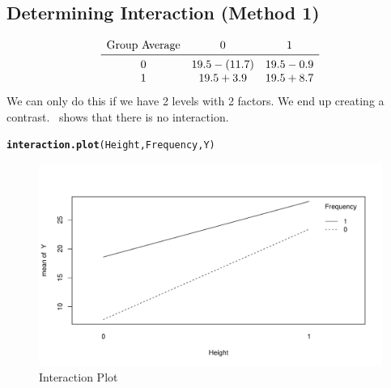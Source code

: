 \documentclass[oneside]{book}\usepackage[]{graphicx}\usepackage[dvipsnames,table,xcdraw]{xcolor}
\makeatletter
\def\maxwidth{ %
  \ifdim\Gin@nat@width>\linewidth
    \linewidth
  \else
    \Gin@nat@width
  \fi
}
\newcommand{\hlstd}[1]{\textcolor[rgb]{0.345,0.345,0.345}{#1}}%
\newcommand{\hlkwd}[1]{\textcolor[rgb]{0.737,0.353,0.396}{\textbf{#1}}}%
\newenvironment{kframe}{%
 \def\at@end@of@kframe{}%
 \ifinner\ifhmode%
  \def\at@end@of@kframe{\end{minipage}}%
  \begin{minipage}{\columnwidth}%
 \fi\fi%
 \def\FrameCommand##1{\hskip\@totalleftmargin \hskip-\fboxsep
 \colorbox{shadecolor}{##1}\hskip-\fboxsep
     \hskip-\linewidth \hskip-\@totalleftmargin \hskip\columnwidth}%
 \MakeFramed {\advance\hsize-\width
   \@totalleftmargin\z@ \linewidth\hsize
   \@setminipage}}%
 {\par\unskip\endMakeFramed%
 \at@end@of@kframe}
\newenvironment{knitrout}{}{} %
\makeatother
\begin{document}
\subsection{Determining Interaction (Method 1)}
\[ \begin{array}{ccc}
        \text{Group Average} & 0             & 1          \\
        \midrule
        0                    & 19.5 - (11.7) & 19.5 - 0.9 \\
        1                    & 19.5 + 3.9    & 19.5 + 8.7
    \end{array} \]
We can only do this if we have 2 levels with 2 factors. We end up creating
a contrast.~ shows that there is no interaction.
\begin{knitrout}
\color{fgcolor}\begin{kframe}
\begin{alltt}
\hlkwd{interaction.plot}\hlstd{(Height, Frequency, Y)}
\end{alltt}
\end{kframe}\begin{figure}

{\centering \includegraphics[width=\maxwidth]{figure/interplot-1} 

}

\caption[Interaction Plot]{Interaction Plot}\label{fig:interplot}
\end{figure}

\end{knitrout}
\end{document}
